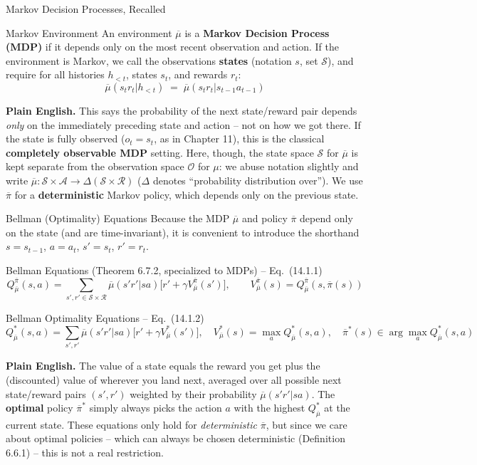 \documentclass[aspectratio=169,10pt]{beamer}
\newcommand{\Sc}{\mathcal{S}}
\newcommand{\Ac}{\mathcal{A}}
\newcommand{\Oc}{\mathcal{O}}
\newcommand{\Rc}{\mathcal{R}}
\newcommand{\hlt}{h_{<t}}
\begin{document}
\begin{frame}{Markov Decision Processes, Recalled}
  \begin{block}{Markov Environment}
    An environment $\overline{\mu}$ is a \textbf{Markov Decision Process
    (MDP)} if it depends only on the most recent observation and action.
    If the environment is Markov, we call the observations \textbf{states}
    (notation $s$, set $\Sc$), and require for all histories $\hlt$, states
    $s_t$, and rewards $r_t$:
    \[
      \overline{\mu}(s_tr_t|\hlt) \;=\; \overline{\mu}(s_tr_t|s_{t-1}a_{t-1})
    \]
  \end{block}
  \textbf{Plain English.} This says the probability of the next
  state/reward pair depends \emph{only} on the immediately preceding state
  and action -- not on how we got there. If the state is fully observed
  ($o_t=s_t$, as in Chapter 11), this is the classical
  \textbf{completely observable MDP} setting. Here, though, the state
  space $\Sc$ for $\overline{\mu}$ is kept separate from the observation
  space $\Oc$ for $\mu$: we abuse notation slightly and write
  $\overline{\mu}:\Sc\times\Ac\to\Delta(\Sc\times\Rc)$ ($\Delta$ denotes
  ``probability distribution over''). We use $\overline{\pi}$ for a
  \textbf{deterministic} Markov policy, which depends only on the previous
  state.
\end{frame}

\begin{frame}{Bellman (Optimality) Equations}
  Because the MDP $\overline{\mu}$ and policy $\overline{\pi}$ depend only
  on the state (and are time-invariant), it is convenient to introduce the
  shorthand $s=s_{t-1}$, $a=a_t$, $s'=s_t$, $r'=r_t$.
  \begin{block}{Bellman Equations (Theorem 6.7.2, specialized to MDPs) -- Eq.\ (14.1.1)}
    \[
      Q_{\overline{\mu}}^{\overline{\pi}}(s,a) = \sum_{s',r'\in\Sc\times\Rc}\overline{\mu}(s'r'|sa)\big[r'+\gamma V_{\overline{\mu}}^{\overline{\pi}}(s')\big],
      \qquad
      V_{\overline{\mu}}^{\overline{\pi}}(s) = Q_{\overline{\mu}}^{\overline{\pi}}(s,\overline{\pi}(s))
    \]
  \end{block}
  \begin{block}{Bellman Optimality Equations -- Eq.\ (14.1.2)}
    \[
      Q_{\overline{\mu}}^*(s,a) = \sum_{s',r'}\overline{\mu}(s'r'|sa)\big[r'+\gamma V_{\overline{\mu}}^*(s')\big],
      \quad
      V_{\overline{\mu}}^*(s) = \max_a Q_{\overline{\mu}}^*(s,a),
      \quad
      \overline{\pi}^*(s)\in\arg\max_a Q_{\overline{\mu}}^*(s,a)
    \]
  \end{block}
  \textbf{Plain English.} The value of a state equals the reward you get
  plus the (discounted) value of wherever you land next, averaged over all
  possible next state/reward pairs $(s',r')$ weighted by their probability
  $\overline{\mu}(s'r'|sa)$. The \textbf{optimal} policy $\overline{\pi}^*$
  simply always picks the action $a$ with the highest $Q^*_{\overline\mu}$
  at the current state. These equations only hold for
  \emph{deterministic} $\overline\pi$, but since we care about optimal
  policies -- which can always be chosen deterministic (Definition
  6.6.1) -- this is not a real restriction.
\end{frame}
\end{document}
